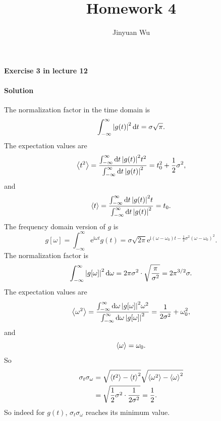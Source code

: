 \documentclass[hyperref, a4paper]{article}
\title{Homework 4}
\author{Jinyuan Wu}
\newcommand*{\ii}{\mathrm{i}}
\newcommand*{\ee}{\mathrm{e}}
\begin{document}
\maketitle

\paragraph{Exercise 3 in lecture 12} 

\paragraph{Solution} The normalization factor in the time domain is 
\begin{equation}
    \int_{-\infty}^\infty \abs{g(t)}^2 \dd{t} = \sigma \sqrt{\pi}.
\end{equation}
The expectation values are 
\begin{equation}
    \expval{t^2} = \frac{\int_{-\infty}^\infty \dd{t} \abs{g(t)}^2 t^2 }{\int_{-\infty}^\infty \dd{t} \abs{g(t)}^2}
    = t_0^2 + \frac{1}{2} \sigma^2,
\end{equation}
and 
\begin{equation}
    \expval{t} = \frac{\int_{-\infty}^\infty \dd{t} \abs{g(t)}^2 t }{\int_{-\infty}^\infty \dd{t} \abs{g(t)}^2}
    = t_0.
\end{equation}
The frequency domain version of $g$ is 
\begin{equation}
    g[\omega] = \int_{-\infty}^\infty \ee^{\ii \omega t} g(t) 
    = \sigma \sqrt{2\pi} \ee^{\ii (\omega - \omega_0) t - \frac{1}{2} \sigma^2 (\omega - \omega_0)^2}.
\end{equation}
The normalization factor is 
\begin{equation}
    \int_{-\infty}^\infty \abs{g[\omega]}^2 \dd{\omega} 
    = 2 \pi \sigma^2 \cdot \sqrt{\frac{\pi}{\sigma^2}} = 2 \pi^{3/2} \sigma.
\end{equation}
The expectation values are 
\begin{equation}
    \expval{\omega^2} = \frac{
        \int_{-\infty}^\infty \dd{\omega} \abs{g[\omega]}^2 \omega^2
    }{
        \int_{-\infty}^\infty \dd{\omega} \abs{g[\omega]}^2
    } = \frac{1}{2 \sigma^2} + \omega_0^2,
\end{equation}
and 
\begin{equation}
    \expval{\omega} = \omega_0.
\end{equation}
So 
\begin{equation}
    \begin{aligned}
        \sigma_t \sigma_\omega &= 
        \sqrt{ \expval{t^2} - \expval{t}^2 } \sqrt{ \expval{\omega^2} - \expval{\omega}^2 } \\
        &= \sqrt{ \frac{1}{2} \sigma^2 \cdot \frac{1}{2 \sigma^2} } = \frac{1}{2}.
    \end{aligned}
\end{equation}
So indeed for $g(t)$,
$\sigma_t \sigma_\omega$ reaches its minimum value.
\end{document}
